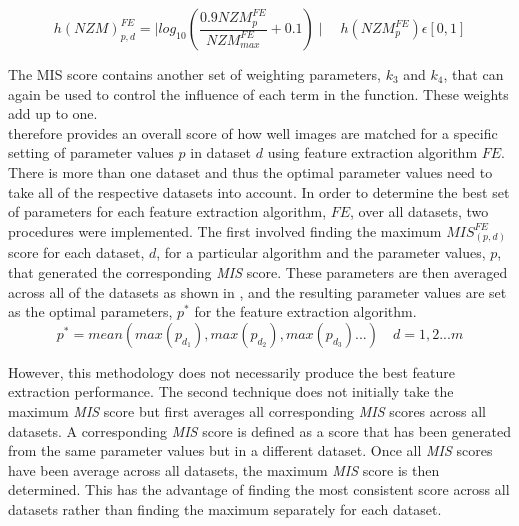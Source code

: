 \documentclass{article}
\begin{document}
\begin{equation}
h(\textit{NZM})_{p, d}^{FE} = \mid log_{10}(\frac{0.9\textit{NZM}_{p}^{FE}}{\textit{NZM}_{max}^{FE}} + 0.1) \mid \quad h(\textit{NZM}_{p}^{FE})\epsilon [0, 1]
\label{eqn:nzm}
\end{equation}

The MIS score contains another set of weighting parameters, $k_3$ and $k_4$, that can again be used to control the influence of each term in the function. These weights add up to one.\\

 therefore provides an overall score of how well images are matched for a specific setting of parameter values $p$ in dataset $d$ using feature extraction algorithm $FE$. \\

There is more than one dataset and thus the optimal parameter values need to take all of the respective datasets into account. In order to determine the best set of parameters for each feature extraction algorithm, $FE$, over all datasets, two procedures were implemented. The first involved finding the maximum $\textit{MIS}_{(p, d)}^{FE}$ score for each dataset, $d$, for a particular algorithm and the parameter values, $p$, that generated the corresponding \textit{MIS} score. These parameters are then averaged across all of the datasets as shown in , and the resulting parameter values are set as the optimal parameters, $p^*$ for the feature extraction algorithm.\\

\begin{equation}
p^* = mean( max(p_{d_1}), max(p_{d_2}), max(p_{d_3}) ...) \quad d = 1,2...m
\label{eqn:average}
\end{equation}

However, this methodology does not necessarily produce the best feature extraction performance. The second technique does not initially take the maximum \textit{MIS} score but first averages all corresponding \textit{MIS} scores across all datasets. A corresponding \textit{MIS} score is defined as a score that has been generated from the same parameter values but in a different dataset. Once all \textit{MIS} scores have been average across all datasets, the maximum \textit{MIS} score is then determined. This has the advantage of finding the most consistent score across all datasets rather than finding the maximum separately for each dataset.\\
\end{document}
